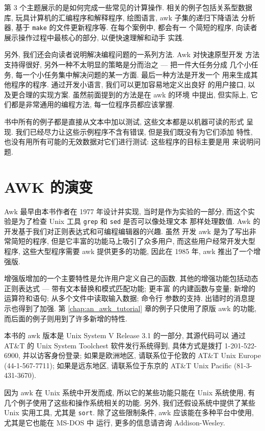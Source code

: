 第 3 个主题展示的是如何完成一些常见的计算操作. 相关的例子包括关系型数据
库, 玩具计算机的汇编程序和解释程序, 绘图语言, awk 子集的递归下降语法
分析器, 基于 \texttt{make} 的文件更新程序等. 在每个案例中, 都会有一
个简短的程序, 向读者展示操作过程中最核心的部分, 以便快速理解和动手
实践.

另外, 我们还会向读者说明解决编程问题的一系列方法. Awk 对快速原型开发
方法支持得很好, 另外一种不太明显的策略是分而治之 --- 把一件大任务分成
几个小任务, 每一个小任务集中解决问题的某一方面. 最后一种方法是开发一个
用来生成其他程序的程序. 通过开发小语言, 我们可以更加容易地定义出良好
的用户接口, 以及更合理的实现方案. 虽然前面提到的方法是在 awk 的环境
中提出, 但实际上, 它们都是非常通用的编程方法, 每一位程序员都应该掌握.

书中所有的例子都是直接从文本中加以测试, 这些文本都是以机器可读的形式
呈现. 我们已经尽力让这些示例程序不含有错误, 但是我们既没有为它们添加
特性, 也没有用所有可能的无效数据对它们进行测试: 这些程序的目标主要是用
来说明问题.

\section*{AWK 的演变}

Awk 最早由本书作者在 1977 年设计并实现, 当时是作为实验的一部分, 而这个实
验是为了检查 Unix 工具 \texttt{grep} 和 \texttt{sed} 是否可以像处理文本
那样处理数值. Awk 的开发基于我们对正则表达式和可编程编辑器的兴趣. 虽然 
开发 awk 是为了写出非常简短的程序, 但是它丰富的功能马上吸引了众多用户,
而这些用户经常开发大型程序, 这些大型程序需要 awk 提供更多的功能, 因此在
1985 年, awk 推出了一个增强版.

增强版增加的一个主要特性是允许用户定义自己的函数.
其他的增强功能包括动态正则表达式 --- 带有文本替换和模式匹配功能; 更丰富
的内建函数与变量; 新增的运算符和语句; 从多个文件中读取输入数据; 命令行 
参数的支持. 出错时的消息提示也得到了加强. 第 \ref{chap:an_awk_tutorial}
章的例子只使用了原版 awk 的功能, 而后面的例子则用到了许多新增的特性.

本书的 awk 版本是 Unix System V Release 3.1 的一部分, 其源代码可以
通过 AT\&T 的 Unix System Toolchest 软件发行系统得到, 具体方式是拨打
1-201-522-6900, 并以访客身份登录; 如果是欧洲地区, 请联系位于伦敦的 AT\&T
Unix Europe (44-1-567-7711); 如果是远东地区, 请联系位于东京的
AT\&T Unix Pacific (81-3-431-3670).

因为 awk 在 Unix 系统中开发而成, 所以它的某些功能只能在 Unix 系统使用,
有几个例子使用了这些和操作系统相关的功能.
另外, 我们还假设系统中提供了某些 Unix 实用工具, 尤其是  \texttt{sort}.
除了这些限制条件, awk 应该能在多种平台中使用, 尤其是它也能在 MS-DOS 中
运行, 更多的信息请咨询 Addison-Wesley.

